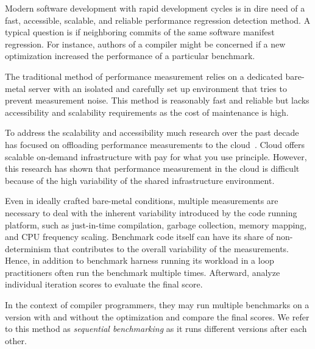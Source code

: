 
Modern software development with rapid development cycles is in dire need of a fast, accessible, scalable, and reliable performance regression detection method.
A typical question is if neighboring commits of the same software manifest regression.
For instance, authors of a compiler might be concerned if a new optimization increased the performance of a particular benchmark.

The traditional method of performance measurement relies on a dedicated bare-metal server with an isolated and carefully set up environment that tries to prevent measurement noise.
This method is reasonably fast and reliable but lacks accessibility and scalability requirements as the cost of maintenance is high.

To address the scalability and accessibility much research over the past decade has focused on offloading performance measurements to the cloud~\cite{leitner2016patterns, laaber2019software, abedi2017conducting}.
Cloud offers scalable \mbox{on-demand} infrastructure with pay for what you use principle.
However, this research has shown that performance measurement in the cloud is difficult because of the high variability of the shared infrastructure environment.

Even in ideally crafted \mbox{bare-metal} conditions, multiple measurements are necessary to deal with the inherent variability introduced by the code running platform, such as \mbox{just-in-time} compilation, garbage collection, memory mapping, and CPU frequency scaling.
Benchmark code itself can have its share of non-determinism that contributes to the overall variability of the measurements.
Hence, in addition to benchmark harness running its workload in a loop practitioners often run the benchmark multiple times.
Afterward, analyze individual iteration scores to evaluate the final score.

In the context of compiler programmers, they may run multiple benchmarks on a version with and without the optimization and compare the final scores.
We refer to this method as \emph{sequential benchmarking} as it runs different versions after each other.

